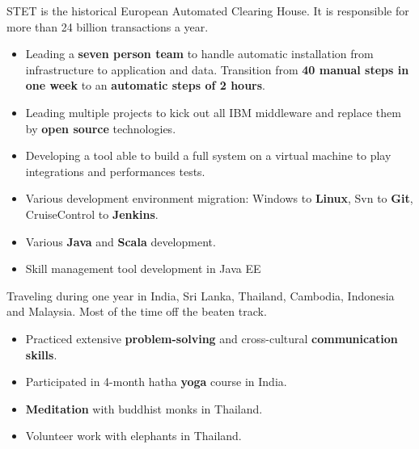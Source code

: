 \documentclass[10pt,a4paper,ragged2e]{altacv}
\begin{document}
	
		STET is the historical European Automated Clearing House. It is responsible for more than 24 billion transactions a year.
	
		\medskip
		\begin{itemize}
			\item Leading a \textbf{seven person team} to handle automatic installation from infrastructure to application and data. Transition from \textbf{40 manual steps in one week} to an \textbf{automatic steps of 2 hours}.
			\item Leading multiple projects to kick out all IBM middleware and replace them by\textbf{ open source} technologies.
			\item Developing a tool able to build a full system on a virtual machine to play integrations and performances tests.
		\end{itemize}
	\divider

		\begin{itemize}
			\item Various development environment migration: Windows to \textbf{Linux}, Svn to \textbf{Git}, CruiseControl to \textbf{Jenkins}.
			\item Various \textbf{Java} and \textbf{Scala} development.
		\end{itemize}
	\divider

		\begin{itemize}
			\item Skill management tool development in Java EE
		\end{itemize}

\bigskip
{}
	
		Traveling during one year in India, Sri Lanka, Thailand, Cambodia, Indonesia and Malaysia. Most of the time off the beaten track. 
		
		\medskip
		\begin{itemize}
			\item Practiced extensive \textbf{problem-solving} and cross-cultural \textbf{communication skills}.
			\item Participated in 4-month hatha \textbf{yoga} course in India.
			\item \textbf{Meditation} with buddhist monks in Thailand.
			\item Volunteer work with elephants in Thailand.
		\end{itemize}
\end{document}
